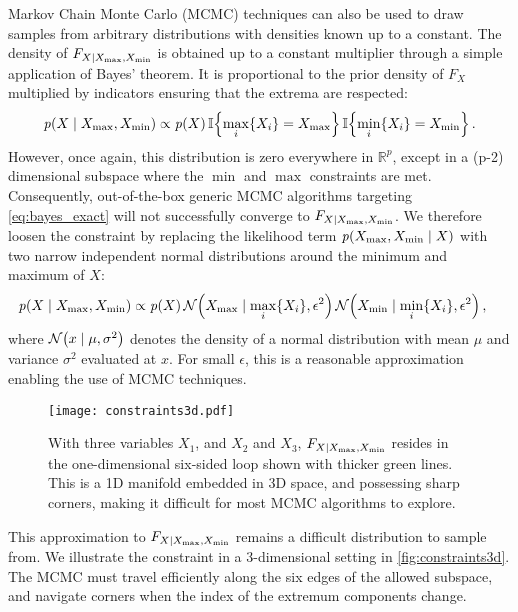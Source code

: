Markov Chain Monte Carlo (MCMC) techniques can also be used to draw samples from arbitrary distributions with densities known up to a constant. The density of \(F_{X \mid X_{\max},X_{\min}}\) is obtained up to a constant multiplier through a simple application of Bayes' theorem. It is proportional to the prior density of \(F_X\) multiplied by indicators ensuring that the extrema are respected:
\begin{equation}
    \prob\del{X \mid \Xmax,\Xmin} 
        \propto \prob\del{X} \Ind\cbr{ \max_i\cbr{X_i} = \Xmax }\Ind\cbr{ \min_i\cbr{X_i} = \Xmin } \,.
\label{eq:bayes_exact}
\end{equation}
However, once again, this distribution is zero everywhere in \(\mathbb{R}^p\), except in a (p-2) dimensional subspace where the \(\min\) and \(\max\) constraints are met.
Consequently, out-of-the-box generic MCMC algorithms targeting \autoref{eq:bayes_exact} will not successfully converge to \(F_{X \mid X_{\max},X_{\min}}\).
We therefore loosen the constraint by replacing the likelihood term \(\prob\del{\Xmax,\Xmin \mid X}\) with two narrow independent normal distributions around the minimum and maximum of \(X\):
\begin{equation}
\begin{split}
    \prob\del{X \mid \Xmax,\Xmin} &\propto \prob\del{X} 
                                         \normal\del{\Xmax \mid \max_i\cbr{X_i}, \epsilon^2}
                                         \normal\del{\Xmin \mid \min_i\cbr{X_i}, \epsilon^2}\,,
\end{split}
\label{eq:normal_lik}
\end{equation}
where \(\normal\del{x \mid \mu, \sigma^2}\) denotes the density of a normal distribution with mean \(\mu\) and variance \(\sigma^2\) evaluated at \(x\).
For small \(\epsilon\), this is a reasonable approximation enabling the use of MCMC techniques.

\begin{figure}[tbp]
\centering
\texttt{[image: constraints3d.pdf]}
\caption{\label{fig:constraints3d}
With three variables \(X_1\), and \(X_2\) and \(X_3\), \(F_{X \mid X_{\max},X_{\min}}\) resides in the one-dimensional six-sided loop shown with thicker green lines. This is a 1D manifold embedded in 3D space, and possessing sharp corners, making it difficult for most MCMC algorithms to explore.}
\end{figure}

This approximation to \(F_{X \mid X_{\max},X_{\min}}\) remains a difficult distribution to sample from.
We illustrate the constraint in a 3-dimensional setting in \autoref{fig:constraints3d}.
The MCMC must travel efficiently along the six edges of the allowed subspace,
and navigate corners when the index of the extremum components change.

